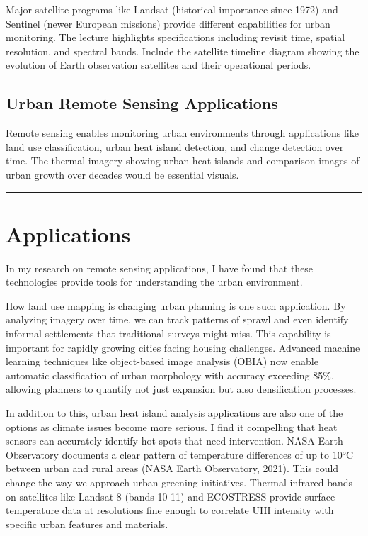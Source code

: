 \documentclass[
  letterpaper,
  DIV=11,
  numbers=noendperiod]{scrreprt}
\begin{document}
Major satellite programs like Landsat (historical importance since 1972)
and Sentinel (newer European missions) provide different capabilities
for urban monitoring. The lecture highlights specifications including
revisit time, spatial resolution, and spectral bands. Include the
satellite timeline diagram showing the evolution of Earth observation
satellites and their operational periods.

\subsection{Urban Remote Sensing
Applications}\label{urban-remote-sensing-applications}

Remote sensing enables monitoring urban environments through
applications like land use classification, urban heat island detection,
and change detection over time. The thermal imagery showing urban heat
islands and comparison images of urban growth over decades would be
essential visuals.

\begin{center}\rule{0.5\linewidth}{0.5pt}\end{center}

\section{Applications}\label{applications}

In my research on remote sensing applications, I have found that these
technologies provide tools for understanding the urban environment.

How land use mapping is changing urban planning is one such application.
By analyzing imagery over time, we can track patterns of sprawl and even
identify informal settlements that traditional surveys might miss. This
capability is important for rapidly growing cities facing housing
challenges. Advanced machine learning techniques like object-based image
analysis (OBIA) now enable automatic classification of urban morphology
with accuracy exceeding 85\%, allowing planners to quantify not just
expansion but also densification processes.

In addition to this, urban heat island analysis applications are also
one of the options as climate issues become more serious. I find it
compelling that heat sensors can accurately identify hot spots that need
intervention. NASA Earth Observatory documents a clear pattern of
temperature differences of up to 10°C between urban and rural areas
(NASA Earth Observatory, 2021). This could change the way we approach
urban greening initiatives. Thermal infrared bands on satellites like
Landsat 8 (bands 10-11) and ECOSTRESS provide surface temperature data
at resolutions fine enough to correlate UHI intensity with specific
urban features and materials.
\end{document}
